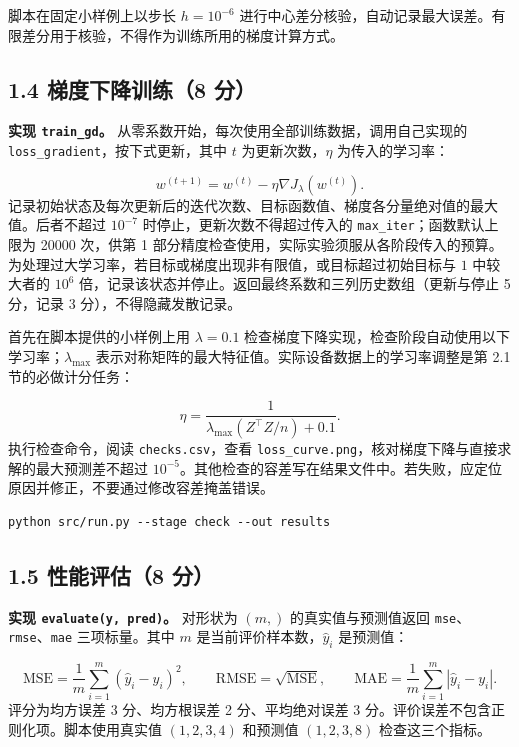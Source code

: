 \documentclass[11pt,a4paper]{article}
\newcommand{\code}[1]{{\small\nolinkurl{#1}}}
\begin{document}
脚本在固定小样例上以步长 $h=10^{-6}$ 进行中心差分核验，自动记录最大误差。有限差分用于核验，不得作为训练所用的梯度计算方式。


\subsection*{1.4 梯度下降训练（8 分）}
\textbf{实现 \code{train_gd}。} 从零系数开始，每次使用全部训练数据，调用自己实现的 \code{loss_gradient}，按下式更新，其中 $t$ 为更新次数，$\eta$ 为传入的学习率：


\[
w^{(t+1)}=w^{(t)}-\eta\nabla J_\lambda(w^{(t)}).
\]
记录初始状态及每次更新后的迭代次数、目标函数值、梯度各分量绝对值的最大值。后者不超过 $10^{-7}$ 时停止，更新次数不得超过传入的 \code{max_iter}；函数默认上限为 20000 次，供第 1 部分精度检查使用，实际实验须服从各阶段传入的预算。为处理过大学习率，若目标或梯度出现非有限值，或目标超过初始目标与 $1$ 中较大者的 $10^6$ 倍，记录该状态并停止。返回最终系数和三列历史数组（更新与停止 5 分，记录 3 分），不得隐藏发散记录。

首先在脚本提供的小样例上用 $\lambda=0.1$ 检查梯度下降实现，检查阶段自动使用以下学习率；$\lambda_{\max}$ 表示对称矩阵的最大特征值。实际设备数据上的学习率调整是第 2.1 节的必做计分任务：


\[
\eta=\frac{1}{\lambda_{\max}(Z^\top Z/n)+0.1}.
\]
执行检查命令，阅读 \code{checks.csv}，查看 \code{loss_curve.png}，核对梯度下降与直接求解的最大预测差不超过 $10^{-5}$。其他检查的容差写在结果文件中。若失败，应定位原因并修正，不要通过修改容差掩盖错误。


\par{}\noindent\begin{minipage}{\linewidth}
\begin{lstlisting}[aboveskip=0pt,belowskip=0pt]
python src/run.py --stage check --out results
\end{lstlisting}
\end{minipage}\par{}

\subsection*{1.5 性能评估（8 分）}
\textbf{实现 {\small\texttt{evaluate(y, pred)}}。} 对形状为 $(m,)$ 的真实值与预测值返回 \code{mse}、\code{rmse}、\code{mae} 三项标量。其中 $m$ 是当前评价样本数，$\hat y_i$ 是预测值：


\[
\mathrm{MSE}=\frac1m\sum_{i=1}^m(\hat y_i-y_i)^2,
\qquad \mathrm{RMSE}=\sqrt{\mathrm{MSE}},
\qquad \mathrm{MAE}=\frac1m\sum_{i=1}^m|\hat y_i-y_i|.
\]
评分为均方误差 3 分、均方根误差 2 分、平均绝对误差 3 分。评价误差不包含正则化项。脚本使用真实值 $(1,2,3,4)$ 和预测值 $(1,2,3,8)$ 检查这三个指标。
\end{document}
